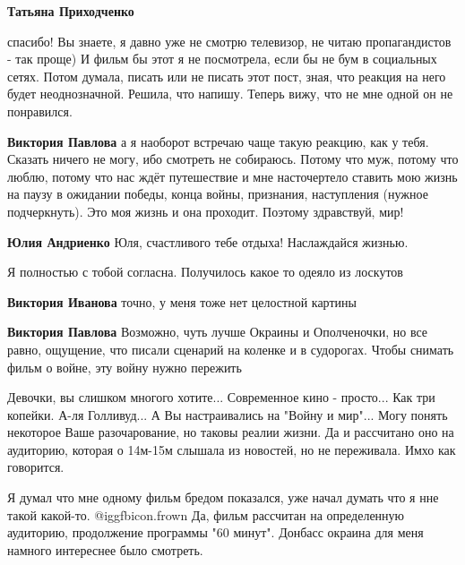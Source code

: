 \begin{itemize}
\begin{itemize}
\textbf{Татьяна Приходченко} 

спасибо! Вы знаете, я давно уже не смотрю телевизор, не читаю пропагандистов -
так проще) И фильм бы этот я не посмотрела, если бы не бум в социальных сетях.
Потом думала, писать или не писать этот пост, зная, что реакция на него будет
неоднозначной. Решила, что напишу. Теперь вижу, что не мне одной он не
понравился.

\textbf{Виктория Павлова} а я наоборот встречаю чаще такую реакцию, как у тебя. Сказать ничего не могу, ибо смотреть не собираюсь. Потому что муж, потому что люблю, потому что нас ждёт путешествие и мне насточертело ставить мою жизнь на паузу в ожидании победы, конца войны, признания, наступления (нужное подчеркнуть). Это моя жизнь и она проходит. Поэтому здравствуй, мир!

\textbf{Юлия Андриенко} Юля, счастливого тебе отдыха! Наслаждайся жизнью.

\end{itemize} %

Я полностью с тобой согласна. Получилось какое то одеяло из лоскутов

\begin{itemize} %
\textbf{Виктория Иванова} точно, у меня тоже нет целостной картины

\textbf{Виктория Павлова} Возможно, чуть лучше Окраины и Ополченочки, но все равно, ощущение, что писали сценарий на коленке и в судорогах.
Чтобы снимать фильм о войне, эту войну нужно пережить
\end{itemize} %


Девочки, вы слишком многого хотите... Современное кино - просто... Как три
копейки. А-ля Голливуд... А Вы настраивались на "Войну и мир"... Могу понять
некоторое Ваше разочарование, но таковы реалии жизни. Да и рассчитано оно на
аудиторию, которая о 14м-15м слышала из новостей, но не переживала. Имхо как
говорится.


Я думал что мне одному фильм бредом показался, уже начал думать что я нне такой
какой-то. @igg{fbicon.frown}  Да, фильм рассчитан на определенную аудиторию, продолжение
программы "60 минут". Донбасс окраина для меня намного интереснее было
смотреть.


\end{itemize}

